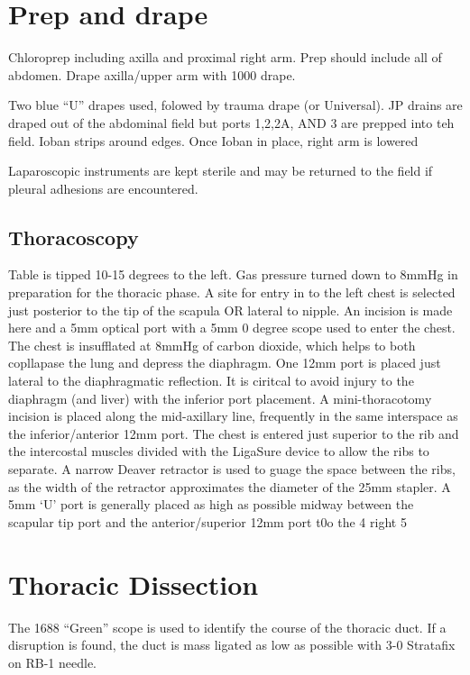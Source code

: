 \documentclass[
  letterpaper,
]{scrbook}
\begin{document}
\section{Prep and drape}\label{prep-and-drape-1}

Chloroprep including axilla and proximal right arm. Prep should include
all of abdomen. Drape axilla/upper arm with 1000 drape.

Two blue ``U'' drapes used, folowed by trauma drape (or Universal). JP
drains are draped out of the abdominal field but ports 1,2,2A, AND 3 are
prepped into teh field. Ioban strips around edges. Once Ioban in place,
right arm is lowered

Laparoscopic instruments are kept sterile and may be returned to the
field if pleural adhesions are encountered.

\subsection{Thoracoscopy}\label{thoracoscopy}

Table is tipped 10-15 degrees to the left. Gas pressure turned down to
8mmHg in preparation for the thoracic phase. A site for entry in to the
left chest is selected just posterior to the tip of the scapula OR
lateral to nipple. An incision is made here and a 5mm optical port with
a 5mm 0 degree scope used to enter the chest. The chest is insufflated
at 8mmHg of carbon dioxide, which helps to both copllapase the lung and
depress the diaphragm. One 12mm port is placed just lateral to the
diaphragmatic reflection. It is ciritcal to avoid injury to the
diaphragm (and liver) with the inferior port placement. A
mini-thoracotomy incision is placed along the mid-axillary line,
frequently in the same interspace as the inferior/anterior 12mm port.
The chest is entered just superior to the rib and the intercostal
muscles divided with the LigaSure device to allow the ribs to separate.
A narrow Deaver retractor is used to guage the space between the ribs,
as the width of the retractor approximates the diameter of the 25mm
stapler. A 5mm `U' port is generally placed as high as possible midway
between the scapular tip port and the anterior/superior 12mm port t0o
the 4 right 5

\section{Thoracic Dissection}\label{thoracic-dissection-1}

The 1688 ``Green'' scope is used to identify the course of the thoracic
duct. If a disruption is found, the duct is mass ligated as low as
possible with 3-0 Stratafix on RB-1 needle.
\end{document}
